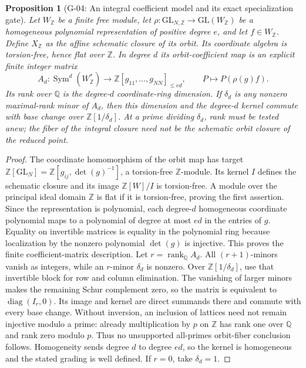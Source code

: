 \documentclass[11pt,a4paper]{article}
\newtheorem{proposition}{Proposition}
\theoremstyle{definition}\newtheorem{definition}{Definition}
\begin{document}
\begin{proposition}[G-04: An integral coefficient model and its exact specialization gate]\label{G-04}
Let $W_{\mathbb Z}$ be a finite free module, let $\rho:\mathrm{GL}_{N,\mathbb Z}\to\mathrm{GL}(W_{\mathbb Z})$ be a homogeneous polynomial representation of positive degree $e$, and let $f\in W_{\mathbb Z}$. Define $X_{\mathbb Z}$ as the affine schematic closure of its orbit. Its coordinate algebra is torsion-free, hence flat over $\mathbb Z$. In degree $d$ its orbit-coefficient map is an explicit finite integer matrix
\[
 A_d:\operatorname{Sym}^d(W_{\mathbb Z}^*)\longrightarrow
 \mathbb Z[g_{11},\ldots,g_{NN}]_{\leq ed},\qquad P\longmapsto P(\rho(g)f).
\]
Its rank over $\mathbb Q$ is the degree-$d$ coordinate-ring dimension. If $\delta_d$ is any nonzero maximal-rank minor of $A_d$, then this dimension and the degree-$d$ kernel commute with base change over $\mathbb Z[1/\delta_d]$. At a prime dividing $\delta_d$, rank must be tested anew; the fiber of the integral closure need not be the schematic orbit closure of the reduced point.
\end{proposition}
\begin{proof}
The coordinate homomorphism of the orbit map has target $\mathbb Z[\mathrm{GL}_N]=\mathbb Z[g_{ij},\det(g)^{-1}]$, a torsion-free $\mathbb Z$-module. Its kernel $I$ defines the schematic closure and its image $\mathbb Z[W]/I$ is torsion-free. A module over the principal ideal domain $\mathbb Z$ is flat if it is torsion-free, proving the first assertion. Since the representation is polynomial, each degree-$d$ homogeneous coordinate polynomial maps to a polynomial of degree at most $ed$ in the entries of $g$. Equality on invertible matrices is equality in the polynomial ring because localization by the nonzero polynomial $\det(g)$ is injective. This proves the finite coefficient-matrix description.
Let $r=\operatorname{rank}_{\mathbb Q}A_d$. All $(r+1)$-minors vanish as integers, while an $r$-minor $\delta_d$ is nonzero. Over $\mathbb Z[1/\delta_d]$, use that invertible block for row and column elimination. The vanishing of larger minors makes the remaining Schur complement zero, so the matrix is equivalent to $\operatorname{diag}(I_r,0)$. Its image and kernel are direct summands there and commute with every base change. Without inversion, an inclusion of lattices need not remain injective modulo a prime: already multiplication by $p$ on $\mathbb Z$ has rank one over $\mathbb Q$ and rank zero modulo $p$. Thus no unsupported all-primes orbit-fiber conclusion follows. Homogeneity sends degree $d$ to degree $ed$, so the kernel is homogeneous and the stated grading is well defined. If $r=0$, take $\delta_d=1$.
\end{proof}
\end{document}
